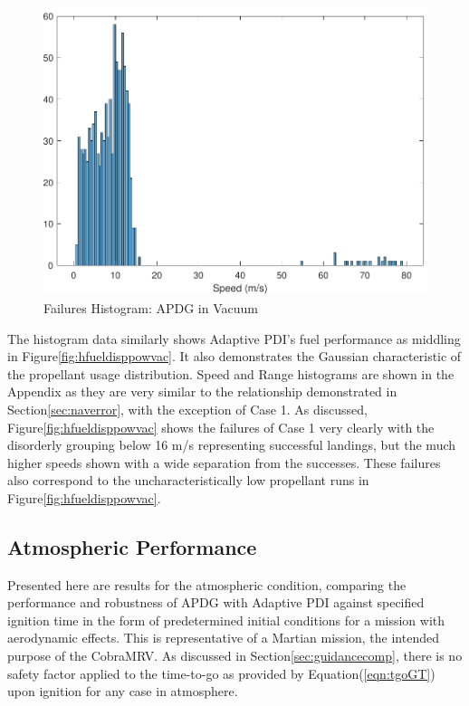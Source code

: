 \begin{figure}[H]
	\centering
	\begin{minipage}{4.3 in}
		\includegraphics[width=\linewidth]{Figures/hspdfaildisppowvac.pdf}
		\caption{Failures Histogram: APDG in Vacuum \label{fig:hspdfaildisppowvac} }
	\end{minipage}
\end{figure}

The histogram data similarly shows Adaptive PDI's fuel performance as middling in Figure\:\ref{fig:hfueldisppowvac}. It also demonstrates the Gaussian characteristic of the propellant usage distribution. Speed and Range histograms are shown in the Appendix as they are very similar to the relationship demonstrated in Section\:\ref{sec:naverror}, with the exception of Case 1. As discussed, Figure\:\ref{fig:hfueldisppowvac} shows the failures of Case 1 very clearly with the disorderly grouping below 16 m/s representing successful landings, but the much higher speeds shown with a wide separation from the successes. These failures also correspond to the uncharacteristically low propellant runs in Figure\:\ref{fig:hfueldisppowvac}.


\subsection{Atmospheric Performance} \label{sec:atmoperf}

Presented here are results for the atmospheric condition, comparing the performance and robustness of APDG with Adaptive PDI against specified ignition time in the form of predetermined initial conditions for a mission with aerodynamic effects. This is representative of a Martian mission, the intended purpose of the CobraMRV. As discussed in Section\:\ref{sec:guidancecomp}, there is no safety factor applied to the time-to-go as provided by Equation\:(\ref{eqn:tgoGT}) upon ignition for any case in atmosphere. 

